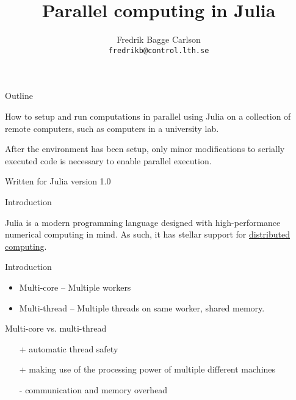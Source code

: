 \documentclass[10pt]{beamer}
\begin{document}
\newlength\figureheight
\newlength\figurewidth
\setlength{\figurewidth}{0.4\textwidth}
\setlength{\figureheight }{4cm }

\title{Parallel computing in Julia}
\author{Fredrik Bagge Carlson\\ \texttt{fredrikb@control.lth.se}}

\maketitle
\begin{frame}{Outline}{}

	How to setup and run computations in parallel using Julia on a collection of remote computers, such as computers in a university lab.

	After the environment has been setup, only minor modifications to serially executed code is necessary to enable parallel execution.

	Written for Julia version 1.0

\end{frame}

\begin{frame}{Introduction}

	Julia is a modern programming language designed with high-performance numerical computing in mind. As such, it has stellar support for \href{https://docs.julialang.org/en/v1/manual/parallel-computing/}{distributed computing}.
\end{frame}


\begin{frame}{Introduction}{}
	\begin{itemize}
		\item Multi-core -- Multiple workers
		\item Multi-thread -- Multiple threads on same worker, shared memory.
	\end{itemize}

	Multi-core vs. multi-thread
	\begin{itemize}
		\item[+] automatic thread safety
		\item[+] making use of the processing power of multiple different machines
		\item[-] communication and memory overhead
	\end{itemize}
\end{frame}
\end{document}

